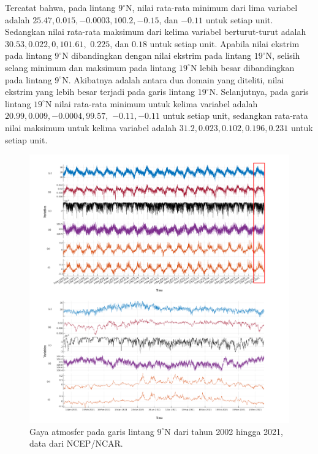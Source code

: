 \begin{spacing}{1.5}
		Tercatat bahwa, pada lintang $9^\circ$N, nilai rata-rata minimum dari lima variabel adalah $25.47, 0.015, -0.0003, 100.2, -0.15$, dan $-0.11$ untuk setiap unit. Sedangkan nilai rata-rata maksimum dari kelima variabel berturut-turut adalah $30.53, 0.022, 0, 101.61,$ $0.225$, dan $0.18$ untuk setiap unit. Apabila nilai ekstrim pada lintang $9^\circ$N dibandingkan dengan nilai ekstrim pada lintang $19^\circ$N, selisih selang minimum dan maksimum pada lintang $19^\circ$N lebih besar dibandingkan pada lintang $9^\circ$N. Akibatnya adalah antara dua domain yang diteliti, nilai ekstrim yang lebih besar terjadi pada garis lintang $19^\circ$N. Selanjutnya, pada garis lintang $19^\circ$N nilai rata-rata minimum untuk kelima variabel adalah $20.99, 0.009, -0.0004, 99.57,$ $-0.11, -0.11$ untuk setiap unit, sedangkan rata-rata nilai maksimum untuk kelima variabel adalah $31.2, 0.023, 0.102, 0.196 , 0.231$ untuk setiap unit.
		
		\begin{figure}[H]
			\centering
			\includegraphics[width=16cm]{contents/final_figure/Figure_5a}
			\caption{Gaya atmosfer pada garis lintang $9^\circ$N dari tahun 2002 hingga 2021, data dari NCEP/NCAR.}
			\label{fig:ncep_1}
		\end{figure}
	

\end{spacing}
